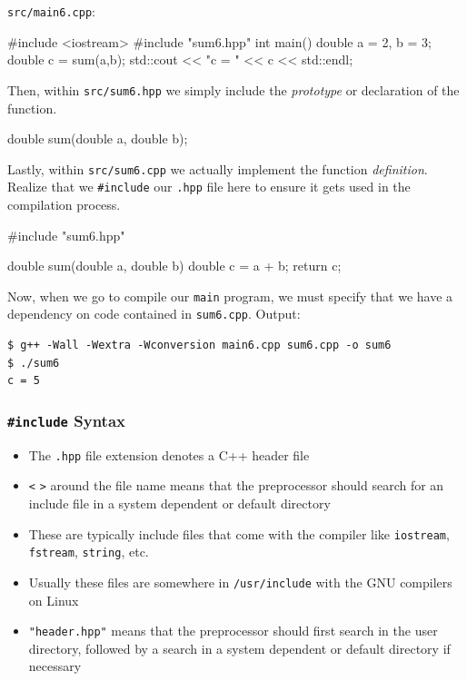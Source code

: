 \documentclass[12pt,letterpaper,twoside]{article}
\begin{document}
\texttt{src/main6.cpp}:

\begin{cpp}
#include <iostream> #include "sum6.hpp"
 int main() {
  double a = 2, b = 3;   double c = sum(a,b);
  std::cout << "c = " << c << std::endl;
} \end{cpp}

Then, within \texttt{src/sum6.hpp} we simply include the \emph{prototype} or 
declaration of the function.

\begin{cpp}
double sum(double a, double b);
\end{cpp}

Lastly, within \texttt{src/sum6.cpp} we actually implement the function \emph{definition}.
Realize that we \texttt{\#include} our \texttt{.hpp} file here to ensure it 
gets used in the compilation process.

\begin{cpp}
#include "sum6.hpp"

double sum(double a, double b) {
  double c = a + b;
  return c;
}
\end{cpp}

Now, when we go to compile our \texttt{main} program, we must specify that we have a 
dependency on code contained in \texttt{sum6.cpp}.
Output:

\begin{verbatim}
$ g++ -Wall -Wextra -Wconversion main6.cpp sum6.cpp -o sum6
$ ./sum6
c = 5
\end{verbatim}

\subsubsection{\texttt{\#include} Syntax}
\begin{itemize}
\item
  The \texttt{.hpp} file extension denotes a C++ header file
\item
  \texttt{\textless{}} \texttt{\textgreater{}} around the file name
  means that the preprocessor should search for an include file in a
  system dependent or default directory
\item
  These are typically include files that come with the compiler like
  \texttt{iostream}, \texttt{fstream}, \texttt{string}, etc.
\item
  Usually these files are somewhere in \texttt{/usr/include} with the
  GNU compilers on Linux
\item
  \texttt{"header.hpp"} means that the preprocessor should first search
  in the user directory, followed by a search in a system dependent or
  default directory if necessary
\end{itemize}
\end{document}

